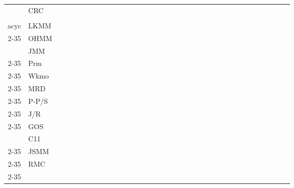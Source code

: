 \begin{landscape}
\begin{table*}
\begin{tabular}{|c|l|c|c|c|c|c|c|c|c|c|c|c|c|c|c|c|c|c|c|c|c|c|c|c|c|c|c|c|c|c|c|c|c|c|}
 & CRC            & & & & & & & & & & & & & & & & & & & & & & & & & & & & & & & & & \\ \Xhline{2\arrayrulewidth}

 \multirow{2}{*}{\rotatebox[origin=c]{270}{\makecell{$\lPPO\lRF$\\acyc}}}   

 & LKMM           & & & & & & & & & & & & & & & & & & & & & & & & & & & & & & & & & \\ \cline{2-35}

 & OHMM           & & & & & & & & & & & & & & & & & & & & & & & & & & & & & & & & & \\ \Xhline{2\arrayrulewidth}

 \multirow{7}{*}{\rotatebox[origin=c]{270}{\makecell{no-OOTA}}}   

 & JMM            & & & & & & & & & & & & & & & & & & & & & & & & & & & & & & & & & \\ \cline{2-35}

 & Prm            & & & & & & & & & & & & & & & & & & & & & & & & & & & & & & & & & \\ \cline{2-35}

 & Wkmo           & & & & & & & & & & & & & & & & & & & & & & & & & & & & & & & & & \\ \cline{2-35}

 & MRD            & & & & & & & & & & & & & & & & & & & & & & & & & & & & & & & & & \\ \cline{2-35}

 & P-P/S          & & & & & & & & & & & & & & & & & & & & & & & & & & & & & & & & & \\ \cline{2-35}

 & J/R            & & & & & & & & & & & & & & & & & & & & & & & & & & & & & & & & & \\ \cline{2-35}

 & GOS            & & & & & & & & & & & & & & & & & & & & & & & & & & & & & & & & & \\ \Xhline{2\arrayrulewidth}

 \multirow{5}{*}{\rotatebox[origin=c]{270}{\makecell{OOTA}}}   

 & C11            & & & & & & & & & & & & & & & & & & & & & & & & & & & & & & & & & \\ \cline{2-35}

 & JSMM           & & & & & & & & & & & & & & & & & & & & & & & & & & & & & & & & & \\ \cline{2-35}

 & RMC            & & & & & & & & & & & & & & & & & & & & & & & & & & & & & & & & & \\ \cline{2-35}


\end{tabular}
\end{table*}
\end{landscape}
